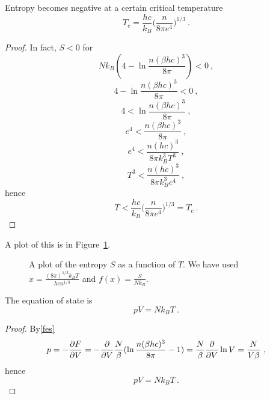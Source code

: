     Entropy becomes negative at a certain critical temperature
    \begin{equation*}
        T_c = \frac{hc}{k_B} \Big (\frac{n}{8\pi e^4} \Big)^{1/3} ~.
    \end{equation*}
    \begin{proof}
        In fact, $S < 0$ for 
        \begin{equation*}
            N k_B (4 - \ln \frac{n (\beta h c)^3}{8\pi} ) < 0 ~,
        \end{equation*}
        \begin{equation*}
            4 - \ln \frac{n (\beta h c)^3}{8\pi} < 0 ~,
        \end{equation*}
        \begin{equation*}
            4 < \ln \frac{n (\beta h c)^3}{8\pi} ~,
        \end{equation*}
        \begin{equation*}
            e^{4} < \frac{n (\beta h c)^3}{8\pi} ~,
        \end{equation*}
        \begin{equation*}
            e^{4} < \frac{n (h c)^3}{8\pi k_B^3 T^3}  ~,
        \end{equation*}
        \begin{equation*}
            T^3 < \frac{n (h c)^3}{8\pi k_B^3 e^4} ~,
        \end{equation*}
        hence 
        \begin{equation*}
            T < \frac{hc}{k_B} \Big (\frac{n}{8\pi e^4} \Big)^{1/3} = T_c ~.
        \end{equation*}
    \end{proof}
    A plot of this is in Figure~\ref{can:ent3}.
    \begin{figure}[h!]
        \centering
        \caption{A plot of the entropy $S$ as a function of $T$. We have used $x = \frac{(8 \pi)^{1/3} k_B T}{h c n^{1/3}}$ and $f(x) = \frac{S}{N k_B}$.}
        \label{can:ent3}
    \end{figure}
    
    The equation of state is 
    \begin{equation}\label{idesultra}
        p V = N k_B T ~.
    \end{equation}
    \begin{proof}
        By\eqref{fes}
        \begin{equation*}
            p = - \frac{\partial F}{\partial V} = - \frac{\partial}{\partial V} \frac{N}{\beta} (\ln \frac{n (\beta h c)^3}{8\pi} - 1) = \frac{N}{\beta} \frac{\partial}{\partial V} \ln V = \frac{N}{V \beta} ~,
        \end{equation*}
        hence 
        \begin{equation*}
            p V = N k_B T ~.
        \end{equation*}
    \end{proof}
    
